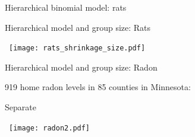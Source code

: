 \documentclass[finnish,english,t]{beamer}
\begin{document}
\begin{frame}{Hierarchical binomial model: rats}


\end{frame}




\begin{frame}{Hierarchical model and group size: Rats}

  \vspace{-\baselineskip}
   \begin{minipage}[b]{12cm}
    {  \hspace{-0.7cm}~\texttt{[image: rats\_shrinkage\_size.pdf]}}
   \end{minipage}
  
\end{frame}

\begin{frame}{Hierarchical model and group size: Radon}

  919 home radon levels in 85 counties in Minnesota:
  
    \hspace{0.2cm} Separate \hspace{4.3cm} 
  \begin{minipage}[b]{12cm}
    {  \hspace{-0.9cm}~\texttt{[image: radon2.pdf]}}
  \end{minipage}
  
\end{frame}
\end{document}
